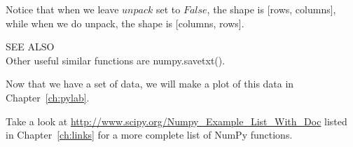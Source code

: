 Notice that when we leave $unpack$ set to $False$, the shape is [rows,
columns], while when we do unpack, the shape is [columns, rows].

{\color{blue} {\sf\small SEE ALSO}} \\
Other useful similar functions are {\sf\small numpy.savetxt()}.

Now that we have a set of data, we will make a plot of this data in
Chapter~\ref{ch:pylab}.  

Take a look at
\url{http://www.scipy.org/Numpy\_Example\_List\_With\_Doc} listed in
Chapter~\ref{ch:links} for a more complete list of NumPy functions.
